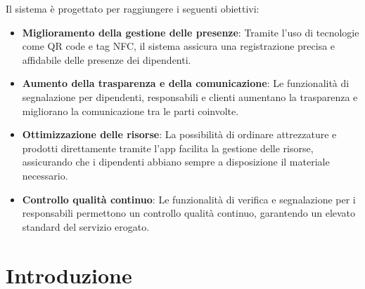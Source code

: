 \documentclass[twoside]{supsistudent}
\begin{document}
Il sistema è progettato per raggiungere i seguenti obiettivi:
\begin{itemize}
  \item \textbf{Miglioramento della gestione delle presenze}: Tramite l'uso di tecnologie come QR code e tag NFC, il sistema assicura una registrazione precisa e affidabile delle presenze dei dipendenti.
  \item \textbf{Aumento della trasparenza e della comunicazione}: Le funzionalità di segnalazione per dipendenti, responsabili e clienti aumentano la trasparenza e migliorano la comunicazione tra le parti coinvolte.
  \item \textbf{Ottimizzazione delle risorse}: La possibilità di ordinare attrezzature e prodotti direttamente tramite l'app facilita la gestione delle risorse, assicurando che i dipendenti abbiano sempre a disposizione il materiale necessario.
  \item \textbf{Controllo qualità continuo}: Le funzionalità di verifica e segnalazione per i responsabili permettono un controllo qualità continuo, garantendo un elevato standard del servizio erogato.
\end{itemize}

\chapter{Introduzione}
\end{document}
